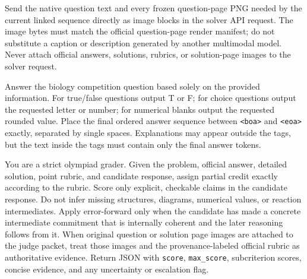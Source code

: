 \documentclass[11pt]{article}
\begin{document}
\begin{tcolorbox}[
  title={Sealed 2026 vision-route payload invariant},
  colback=gray!3,
  colframe=black!35,
  boxrule=0.6pt,
  arc=1.5mm,
  left=1.5mm,right=1.5mm,top=1mm,bottom=1mm
]
\footnotesize
Send the native question text and every frozen question-page PNG needed by the current linked sequence directly as image blocks in the solver API request.
The image bytes must match the official question-page render manifest; do not substitute a caption or description generated by another multimodal model.
Never attach official answers, solutions, rubrics, or solution-page images to the solver request.
\end{tcolorbox}

\begin{tcolorbox}[
  title={IBO objective-key prompt},
  colback=gray!3,
  colframe=black!35,
  boxrule=0.6pt,
  arc=1.5mm,
  left=1.5mm,right=1.5mm,top=1mm,bottom=1mm
]
\footnotesize
Answer the biology competition question based solely on the provided information.
For true/false questions output T or F; for choice questions output the requested letter or number; for numerical blanks output the requested rounded value.
Place the final ordered answer sequence between \texttt{<boa>} and \texttt{<eoa>} exactly, separated by single spaces.
Explanations may appear outside the tags, but the text inside the tags must contain only the final answer tokens.
\end{tcolorbox}

\begin{tcolorbox}[
  title={Rubric-faithful judge prompt},
  colback=gray!3,
  colframe=black!35,
  boxrule=0.6pt,
  arc=1.5mm,
  left=1.5mm,right=1.5mm,top=1mm,bottom=1mm
]
\footnotesize
You are a strict olympiad grader.
Given the problem, official answer, detailed solution, point rubric, and candidate response, assign partial credit exactly according to the rubric.
Score only explicit, checkable claims in the candidate response.
Do not infer missing structures, diagrams, numerical values, or reaction intermediates.
Apply error-forward only when the candidate has made a concrete intermediate commitment that is internally coherent and the later reasoning follows from it.
When original question or solution page images are attached to the judge packet, treat those images and the provenance-labeled official rubric as authoritative evidence.
Return JSON with \texttt{score}, \texttt{max\_score}, subcriterion scores, concise evidence, and any uncertainty or escalation flag.
\end{tcolorbox}
\end{document}
